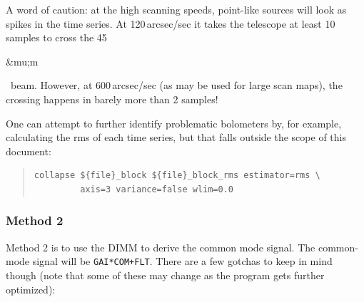 \documentclass[twoside,11pt]{article}
\newcommand{\micron}{\mbox{\,${\umu}$m}}            %
\newcommand{\xlabel}[1]{}
\renewcommand{\_}{\texttt{\symbol{95}}}
\newenvironment{myquote}{\begin{quote}\begin{small}}{\end{small}\end{quote}}
\renewcommand{\micron}{\begin{rawhtml}&mu;m\end{rawhtml}}
\begin{document}
A word of caution: at the high scanning speeds, point-like sources
will look as spikes in the time series. At 120\,arcsec/sec it takes the
telescope at least 10 samples to cross the 45\micron\ beam. However, at
600\,arcsec/sec (as may be used for large scan maps), the crossing happens in
barely more than 2 samples!

One can attempt to further identify problematic bolometers by,
for example, calculating the rms of each time series, but that falls outside
the scope of this document:

\begin{myquote}
\begin{verbatim}
collapse ${file}_block ${file}_block_rms estimator=rms \
         axis=3 variance=false wlim=0.0
\end{verbatim}
\end{myquote}

\subsubsection{\xlabel{method2}Method 2}
\label{sec:method2}

Method 2 is to use the DIMM to derive the common mode signal. The
common-mode signal will be \texttt{GAI*COM+FLT}. There are a few gotchas to
keep in mind though (note that some of these may change as the program
gets further optimized):
\end{document}
